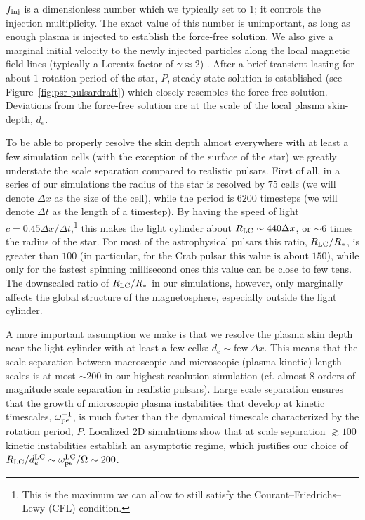  $f_{\rm inj}$ is a dimensionless number which we typically set to $1$; it controls the injection multiplicity. The exact value of this number is unimportant, as long as enough plasma is injected to establish the force-free solution. We also give a marginal initial velocity to the newly injected particles along the local magnetic field lines  (typically a Lorentz factor of $\gamma\approx 2$) \citep[similar technique has been previously used by][]{2015MNRAS.448..606C, 2015MNRAS.449.2759B}. After a brief transient lasting for about $1$ rotation period of the star, $P$, steady-state solution is established (see Figure~\ref{fig:psr-pulsardraft}) which closely resembles the force-free solution. Deviations from the force-free solution are at the scale of the local plasma skin-depth, $d_{e}$. 

To be able to properly resolve the skin depth almost everywhere with at least a few simulation cells (with the exception of the surface of the star) we greatly understate the scale separation compared to realistic pulsars. First of all, in a series of our simulations the radius of the star is resolved by $75$ cells (we will denote $\Delta x$ as the size of the cell), while the period is $6200$ timesteps (we will denote $\Delta t$ as the length of a timestep). By having the speed of light $c=0.45\Delta x/\Delta t$,\footnote{This is the maximum we can allow to still satisfy the Courant–Friedrichs–Lewy (CFL) condition.} this makes the light cylinder about $R_{\rm LC}\sim 440\Delta x$, or $\sim 6$ times the radius of the star. For most of the astrophysical pulsars this ratio, $R_{\rm LC}/R_*$, is greater than $100$ (in particular, for the Crab pulsar this value is about $150$), while only for the fastest spinning millisecond ones this value can be close to few tens. The downscaled ratio of $R_{\rm LC}/R_*$ in our simulations, however, only marginally affects the global structure of the magnetosphere, especially outside the light cylinder. 

A more important assumption we make is that we resolve the plasma skin depth near the light cylinder with at least a few cells: $d_e\sim \text{few}~\Delta x$. This means that the scale separation between macroscopic and microscopic (plasma kinetic) length scales is at most $\sim200$ in our highest resolution simulation (cf. almost $8$ orders of magnitude scale separation in realistic pulsars). Large scale separation ensures that the growth of microscopic plasma instabilities that develop at kinetic timescales, $\omega_{{\rm p}e}^{-1}$, is much faster than the dynamical timescale characterized by the rotation period, $P$. Localized 2D simulations \citep[see, e.g.,][]{2016ApJ...816L...8W} show that at scale separation $\gtrsim 100$ kinetic instabilities establish an asymptotic regime, which justifies our choice of $R_{\rm LC} / d_e^{\rm LC} \sim \omega_{{\rm p}e}^{\rm LC}/\Omega \sim 200$. 

